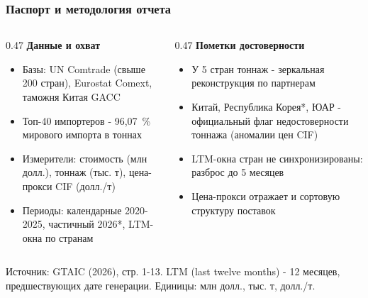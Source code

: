 \documentclass{beamer}
\begin{document}
\begin{frame}[t]
  \frametitle{Паспорт и методология отчета}
  {\footnotesize
  \begin{columns}[t]
    \begin{column}{0.47\textwidth}
      \textbf{Данные и охват}
      \begin{itemize}
        \item Базы: UN Comtrade (свыше 200 стран), Eurostat Comext, таможня Китая GACC
        \item Топ-40 импортеров - 96,07~\% мирового импорта в тоннах
        \item Измерители: стоимость (млн долл.), тоннаж (тыс. т), цена-прокси CIF (долл./т)
        \item Периоды: календарные 2020-2025, частичный 2026*, LTM-окна по странам
      \end{itemize}
    \end{column}
    \begin{column}{0.47\textwidth}
      \textbf{Пометки достоверности}
      \begin{itemize}
        \item У 5 стран тоннаж - зеркальная реконструкция по партнерам
        \item Китай, Республика Корея*, ЮАР - официальный флаг недостоверности тоннажа (аномалии цен CIF)
        \item LTM-окна стран не синхронизированы: разброс до 5 месяцев
        \item Цена-прокси отражает и сортовую структуру поставок
      \end{itemize}
    \end{column}
  \end{columns}}
  \vfill
  {\scriptsize\color{srcgray} Источник: GTAIC (2026), стр. 1-13. LTM (last twelve months) - 12 месяцев, предшествующих дате генерации. Единицы: млн долл., тыс. т, долл./т.\par}
\end{frame}
\end{document}
